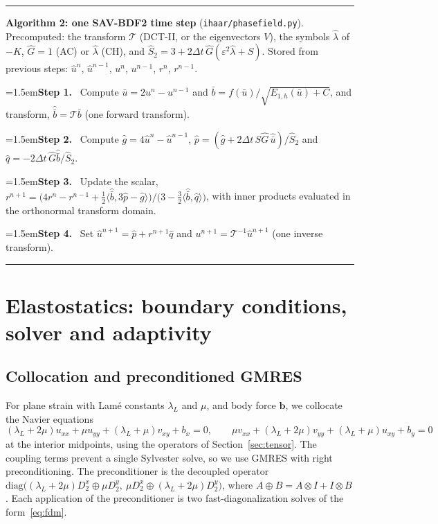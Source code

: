 \documentclass[preprint,12pt]{elsarticle}
\theoremstyle{remark}
\newcommand{\step}[1]{\par\noindent\hangindent=1.5em\hangafter=1\textbf{Step #1.}\ }
\begin{document}
\begin{algorithm}[t]\small\hrule\smallskip
\noindent\textbf{Algorithm 2: one SAV-BDF2 time step} (\texttt{ihaar/phasefield.py}).
Precomputed: the transform $\mathcal T$ (DCT-II, or the eigenvectors $V$), the symbols $\hat\lambda$ of
$-K$, $\hat G=1$ (AC) or $\hat\lambda$ (CH), and $\hat S_2=3+2\Delta t\,\hat G(\varepsilon^2\hat\lambda+S)$.
Stored from previous steps: $\hat u^n$, $\hat u^{n-1}$, $u^n$, $u^{n-1}$, $r^n$, $r^{n-1}$.
\step{1} Compute $\bar u=2u^n-u^{n-1}$ and $\bar b=f(\bar u)/\sqrt{E_{1,h}(\bar u)+C}$, and transform, $\hat{\bar b}=\mathcal T\bar b$ (one forward transform).
\step{2} Compute $\hat g=4\hat u^n-\hat u^{n-1}$, $\hat p=(\hat g+2\Delta t\,S\hat G\,\hat{\bar u})/\hat S_2$ and $\hat q=-2\Delta t\,\hat G\hat{\bar b}/\hat S_2$.
\step{3} Update the scalar, $r^{n+1}=\big(4r^n-r^{n-1}+\tfrac12\langle\hat{\bar b},3\hat p-\hat g\rangle\big)/\big(3-\tfrac32\langle\hat{\bar b},\hat q\rangle\big)$, with inner products evaluated in the orthonormal transform domain.
\step{4} Set $\hat u^{n+1}=\hat p+r^{n+1}\hat q$ and $u^{n+1}=\mathcal T^{-1}\hat u^{n+1}$ (one inverse transform).
\smallskip\hrule
\end{algorithm}

\section{Elastostatics: boundary conditions, solver and adaptivity}\label{sec:elast}
\subsection{Collocation and preconditioned GMRES}
For plane strain with Lam\'e constants $\lambda_L$ and $\mu$, and body force $\mathbf b$, we collocate the
Navier equations
\begin{equation}
(\lambda_L+2\mu)u_{xx}+\mu u_{yy}+(\lambda_L+\mu)v_{xy}+b_x=0,\qquad
\mu v_{xx}+(\lambda_L+2\mu)v_{yy}+(\lambda_L+\mu)u_{xy}+b_y=0
\end{equation}
at the interior midpoints, using the operators of Section~\ref{sec:tensor}. The coupling terms prevent a
single Sylvester solve, so we use GMRES with right preconditioning. The preconditioner is the decoupled
operator
$\mathrm{diag}\big((\lambda_L+2\mu)D_2^x\oplus\mu D_2^y,\ \mu D_2^x\oplus(\lambda_L+2\mu)D_2^y\big)$, where
$A\oplus B=A\otimes I+I\otimes B$. Each application of the preconditioner is two fast-diagonalization
solves of the form~\eqref{eq:fdm}.
\end{document}
